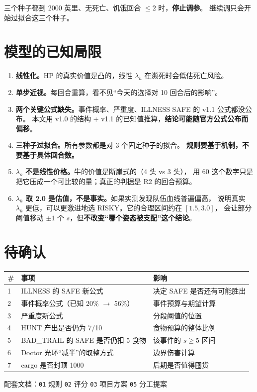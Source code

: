 \documentclass[UTF8,11pt,a4paper]{ctexart}
\begin{document}
\begin{goodbox}[title={校准的收敛标准}]
三个种子都到 2000 英里、无死亡、饥饿回合 $\le2$ 时，\textbf{停止调参}。
继续调只会开始过拟合这三个种子。
\end{goodbox}

\section{模型的已知局限}

\begin{enumerate}[leftmargin=1.8em]
  \item \textbf{线性化。}HP 的真实价值是凸的，线性 $\lambda_h$ 在濒死时会低估死亡风险。
  \item \textbf{单步近视。}每回合重算，看不见“今天的选择对 10 回合后的影响”。
  \item \textbf{两个关键公式缺失。}事件概率、严重度、ILLNESS SAFE 的 v1.1 公式都没公布。
        本文用 v1.0 的结构 + v1.1 的已知值推算，\textbf{结论可能随官方公式公布而偏移}。
  \item \textbf{三种子过拟合。}所有参数都是对 3 个固定种子的拟合。
        \textbf{规则要基于机制，不要基于具体回合数。}
  \item \textbf{$\lambda_o$ 不是线性价格。}牛的价值是断崖式的（4 头 vs 3 头），
        用 60 这个数字只是把它压成一个可比较的量；真正的判据是 R2 的回合预算。
  \item \textbf{$\lambda_h$ 取 2.0 是估值，不是事实。}如果实测发现队伍血线普遍偏高，
        说明真实 $\lambda_h$ 更低，可以更激进地选 RISKY。它的合理区间约在 $[1.5,3.0]$，
        会让部分阈值移动 $\pm1$ 个 $s$，但\textbf{不改变“哪个姿态被支配”这个结论}。
\end{enumerate}

\section{待确认}

\begin{center}
\begin{longtable}{@{}p{0.8cm}p{7.4cm}p{6.4cm}@{}}
\toprule
\textbf{\#} & \textbf{事项} & \textbf{影响} \\
\midrule
\endhead
1 & ILLNESS 的 SAFE 新公式 & 决定 SAFE 是否还有可能胜出 \\
2 & 事件概率公式（已知 20\% $\to$ 56\%） & 事件预算与期望计算 \\
3 & 严重度新公式 & 分段阈值的位置 \\
4 & HUNT 产出是否仍为 7/10 & 食物预算的整体比例 \\
5 & BAD\_TRAIL 的 SAFE 是否仍扣 5 食物 & 该事件的 $s\ge5$ 区间 \\
6 & Doctor 光环“减半”的取整方式 & 边界伤害计算 \\
7 & cargo 是否封顶 1000 & 后期是否值得囤货 \\
\bottomrule
\end{longtable}
\end{center}

\vfill
\begin{center}
\small\color{muted}
配套文档：\texttt{01} 规则 \quad \texttt{02} 评分 \quad \texttt{03} 项目方案 \quad
\texttt{05} 分工提案
\end{center}
\end{document}
